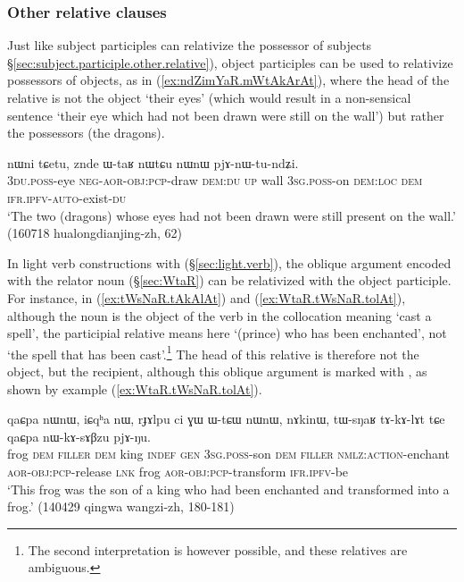 \subsubsection{Other relative clauses}  \label{sec:object.participle.other.relative}
Just like subject participles can relativize the possessor of subjects §\ref{sec:subject.participle.other.relative}), object participles can be used to relativize possessors of objects, as in (\ref{ex:ndZimYaR.mWtAkArAt}), where the head of the relative  is not the object `their eyes' (which would result in a non-sensical sentence `their eye which had not been drawn were still on the wall') but rather the possessors (the dragons).

\begin{exe}
\ex \label{ex:ndZimYaR.mWtAkArAt}
 nɯni tɕetu, znde ɯ-taʁ nɯtɕu nɯnɯ pjɤ-nɯ-tu-ndʑi. \\
\textsc{3du}.\textsc{poss}-eye \textsc{neg}-\textsc{aor}-\textsc{obj}:\textsc{pcp}-draw \textsc{dem}:\textsc{du} \textsc{up} wall \textsc{3sg}.\textsc{poss}-on \textsc{dem}:\textsc{loc} \textsc{dem} \textsc{ifr}.\textsc{ipfv}-\textsc{auto}-exist-\textsc{du} \\
\glt `The two (dragons) whose eyes had not been drawn were still present on the wall.' (160718 hualongdianjing-zh, 62)
\end{exe}

In light verb constructions with  (§\ref{sec:light.verb}), the oblique argument encoded with the relator noun  (§\ref{sec:WtaR}) can be relativized with the object participle. For instance, in (\ref{ex:tWsNaR.tAkAlAt}) and (\ref{ex:WtaR.tWsNaR.tolAt}), although the noun  is the object of the verb  in the collocation meaning `cast a spell', the participial relative  means here  `(prince) who has been enchanted', not `the spell that has been cast'.\footnote{The second interpretation is however possible, and these relatives are ambiguous. } The head of this relative is therefore not the object, but the recipient, although this oblique argument is marked with , as shown by example (\ref{ex:WtaR.tWsNaR.tolAt}).

\begin{exe}
\ex \label{ex:tWsNaR.tAkAlAt}
\gll qaɕpa nɯnɯ, iɕqʰa nɯ, rɟɤlpu ci ɣɯ ɯ-tɕɯ nɯnɯ, nɤkinɯ, tɯ-sŋaʁ tɤ-kɤ-lɤt tɕe qaɕpa nɯ-kɤ-sɤβzu pjɤ-ŋu. \\
frog \textsc{dem} \textsc{filler} \textsc{dem} king \textsc{indef} \textsc{gen} \textsc{3sg}.\textsc{poss}-son \textsc{dem} \textsc{filler} \textsc{nmlz}:\textsc{action}-enchant \textsc{aor}-\textsc{obj}:\textsc{pcp}-release \textsc{lnk} frog \textsc{aor}-\textsc{obj}:\textsc{pcp}-transform \textsc{ifr}.\textsc{ipfv}-be \\
\glt `This frog was the son of a king who had been enchanted and transformed into a frog.' (140429 qingwa wangzi-zh,  180-181)
\end{exe}

